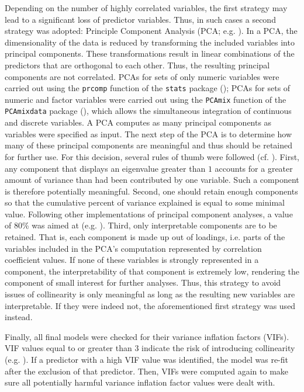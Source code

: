 Depending on the number of highly correlated variables, the first strategy may lead to a significant loss of predictor variables. Thus, in such cases a second strategy was adopted: Principle Component Analysis (PCA; e.g. \cite{Venables2002, Baayen2008, Tomaschek2018collin}). In a PCA, the dimensionality of the data is reduced by transforming the included variables into principal components. These transformations result in linear combinations of the predictors that are orthogonal to each other. Thus, the resulting principal components are not correlated. PCAs for sets of only numeric variables were carried out using the \texttt{prcomp} function of the \texttt{stats} package (\cite{RCore2020}); PCAs for sets of numeric and factor variables were carried out using the \texttt{PCAmix} function of the \texttt{PCAmixdata} package (\cite{Chavent2017}), which allows the simultaneous integration of continuous and discrete variables. A PCA computes as many principal components as variables were specified as input. The next step of the PCA is to determine how many of these principal components are meaningful and thus should be retained for further use. For this decision, several rules of thumb were followed (cf. \cite{ORourke2005, Baayen2008}). First, any component that displays an eigenvalue greater than $1$ accounts for a greater amount of variance than had been contributed by one variable. Such a component is therefore potentially meaningful. Second, one should retain enough components so that the cumulative percent of variance explained is equal to some minimal value. Following other implementations of principal component analyses, a value of 80\% was aimed at (e.g. \cite{ORourke2005}). Third, only interpretable components are to be retained. That is, each component is made up out of loadings, i.e. parts of the variables included in the PCA’s computation represented by correlation coefficient values. If none of these variables is strongly represented in a component, the interpretability of that component is extremely low, rendering the component of small interest for further analyses. Thus, this strategy to avoid issues of collinearity is only meaningful as long as the resulting new variables are interpretable. If they were indeed not, the aforementioned first strategy was used instead.

Finally, all final models were checked for their variance inflation factors (VIFs). VIF values equal to or greater than $3$ indicate the risk of introducing collinearity (e.g. \cite{Zuur2010}). If a predictor with a high VIF value was identified, the model was re-fit after the exclusion of that predictor. Then, VIFs were computed again to make sure all potentially harmful variance inflation factor values were dealt with. 

